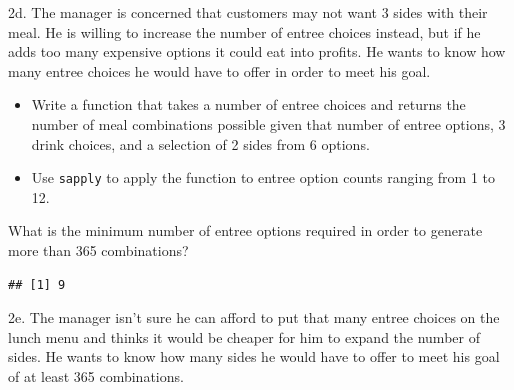 \documentclass[
]{article}
\newenvironment{Shaded}{\begin{snugshade}}{\end{snugshade}}
\newcommand{\ControlFlowTok}[1]{\textcolor[rgb]{0.13,0.29,0.53}{\textbf{#1}}}
\newcommand{\DataTypeTok}[1]{\textcolor[rgb]{0.13,0.29,0.53}{#1}}
\newcommand{\DecValTok}[1]{\textcolor[rgb]{0.00,0.00,0.81}{#1}}
\newcommand{\KeywordTok}[1]{\textcolor[rgb]{0.13,0.29,0.53}{\textbf{#1}}}
\newcommand{\NormalTok}[1]{#1}
\newcommand{\OperatorTok}[1]{\textcolor[rgb]{0.81,0.36,0.00}{\textbf{#1}}}
\newcommand{\StringTok}[1]{\textcolor[rgb]{0.31,0.60,0.02}{#1}}
\providecommand{\tightlist}{%
  \setlength{\itemsep}{0pt}\setlength{\parskip}{0pt}}
\begin{document}
2d. The manager is concerned that customers may not want 3 sides with
their meal. He is willing to increase the number of entree choices
instead, but if he adds too many expensive options it could eat into
profits. He wants to know how many entree choices he would have to offer
in order to meet his goal.

\begin{itemize}
\tightlist
\item
  Write a function that takes a number of entree choices and returns the
  number of meal combinations possible given that number of entree
  options, 3 drink choices, and a selection of 2 sides from 6 options.
\item
  Use \texttt{sapply} to apply the function to entree option counts
  ranging from 1 to 12.
\end{itemize}

What is the minimum number of entree options required in order to
generate more than 365 combinations?

\begin{Shaded}
\end{Shaded}

\begin{verbatim}
## [1] 9
\end{verbatim}

2e. The manager isn't sure he can afford to put that many entree choices
on the lunch menu and thinks it would be cheaper for him to expand the
number of sides. He wants to know how many sides he would have to offer
to meet his goal of at least 365 combinations.
\end{document}

